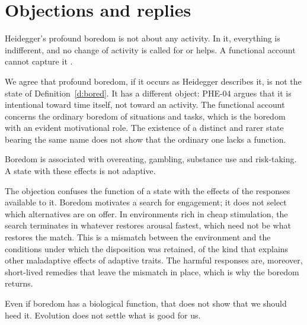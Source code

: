 \documentclass{situationist-preprint}
\begin{document}
\section{Objections and replies}

\begin{objection}\label{o:heid}
Heidegger's profound boredom is not about any activity. In it, everything is indifferent, and no change of activity is called for or helps. A functional account cannot capture it \citep{Heidegger1995}.
\end{objection}

\begin{reply}
We agree that profound boredom, if it occurs as Heidegger describes it, is not the state of Definition~\ref{d:bored}. It has a different object: PHE-04 argues that it is intentional toward time itself, not toward an activity. The functional account concerns the ordinary boredom of situations and tasks, which is the boredom with an evident motivational role. The existence of a distinct and rarer state bearing the same name does not show that the ordinary one lacks a function.
\end{reply}

\begin{objection}\label{o:harm}
Boredom is associated with overeating, gambling, substance use and risk-taking. A state with these effects is not adaptive.
\end{objection}

\begin{reply}
The objection confuses the function of a state with the effects of the responses available to it. Boredom motivates a search for engagement; it does not select which alternatives are on offer. In environments rich in cheap stimulation, the search terminates in whatever restores arousal fastest, which need not be what restores the match. This is a mismatch between the environment and the conditions under which the disposition was retained, of the kind that explains other maladaptive effects of adaptive traits. The harmful responses are, moreover, short-lived remedies that leave the mismatch in place, which is why the boredom returns.
\end{reply}

\begin{objection}\label{o:normative}
Even if boredom has a biological function, that does not show that we should heed it. Evolution does not settle what is good for us.
\end{objection}
\end{document}

